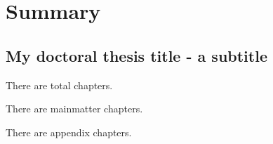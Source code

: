 \chapter*{Summary}\label{ch:abstract}

\section*{My doctoral thesis title - a subtitle}


There are  total chapters.

\noindent There are  mainmatter chapters.

\noindent There are  appendix chapters.

